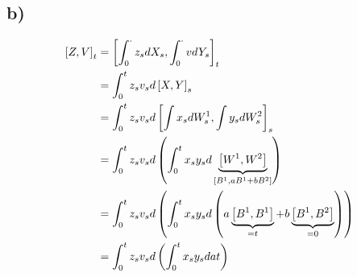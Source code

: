 \documentclass[document.tex]{subfiles}
\begin{document}
\subsection*{b)}

\begin{align*}
	\left[Z , V \right]_t &= \left[\int_0^\cdot z_s dX_s , \int_0^\cdot v dY_s \right]_t\\
&= \int_0^t z_s v_s d \left[X , Y \right]_s\\
&= \int_0^t z_s v_s d \left[\int x_s dW^1_s , \int y_s dW^2_s \right]_s\\
&= \int_0^t z_s v_s d \left( \int_0^t x_s y_s d \underbrace{\left[W^1 , W^2 \right]}
_{\left[B^1 , aB^1+bB^2 \right]} \right) \\ 
&= \int_0^t z_s v_s d \left( \int_0^t x_s y_s d \left( a \underbrace{\left[B^1 , B^1 \right]}_{=t} 
+b \underbrace{\left[B^1 , B^2 \right]}_{=0} \right) \right) \\
&= \int_0^t z_s v_s d \left( \int_0^t x_s y_s d at \right)
\end{align*}
\end{document}
